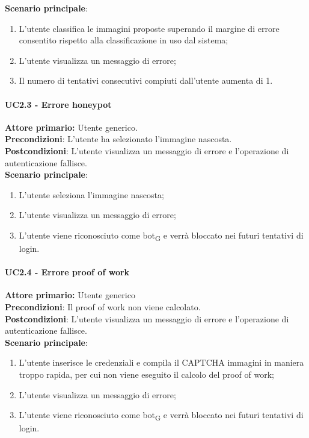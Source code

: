 \textbf{Scenario principale}:
\begin{enumerate}
    \item L'utente classifica le immagini proposte superando il margine di errore consentito rispetto alla classificazione in uso dal sistema;
	\item L’utente visualizza un messaggio di errore;
	\item Il numero di tentativi consecutivi compiuti dall’utente aumenta di 1.
\end{enumerate}

\paragraph{UC2.3 - Errore honeypot}
\textbf{Attore primario:} Utente generico.\\
\textbf{Precondizioni}: L’utente ha selezionato l'immagine nascosta.\\
\textbf{Postcondizioni}: L’utente visualizza un messaggio di errore e l’operazione di autenticazione fallisce.\\

\textbf{Scenario principale}:
\begin{enumerate}
    \item L'utente seleziona l'immagine nascosta;
	\item L’utente visualizza un messaggio di errore;
	\item L'utente viene riconosciuto come bot\textsubscript{G} e verrà bloccato nei futuri tentativi di login.
\end{enumerate}

\paragraph{UC2.4 - Errore proof of work}
\textbf{Attore primario:} Utente generico\\
\textbf{Precondizioni}: Il proof of work non viene calcolato.\\
\textbf{Postcondizioni}:  L’utente visualizza un messaggio di errore e l’operazione di autenticazione fallisce.\\

\textbf{Scenario principale}:
\begin{enumerate}
    \item L'utente inserisce le credenziali e compila il CAPTCHA immagini in maniera troppo rapida, per cui non viene eseguito il calcolo del proof of work;
	\item L’utente visualizza un messaggio di errore;
	\item L'utente viene riconosciuto come bot\textsubscript{G} e verrà bloccato nei futuri tentativi di login.
\end{enumerate}

